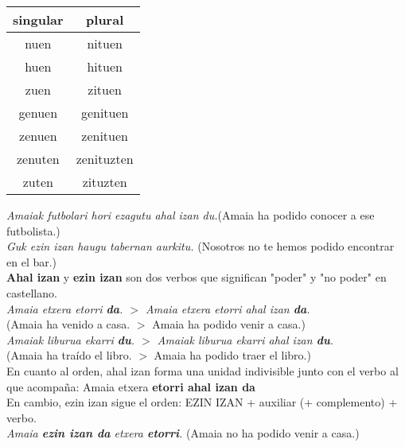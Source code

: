 \documentclass[11pt, a4paper]{article}
\begin{document}
\begin{table}[h]
\centering
\begin{tabular}{cc}
\hline
singular&plural\\
\hline
nuen&nituen\\
huen&hituen\\
zuen&zituen\\
genuen&genituen\\
zenuen&zenituen\\
zenuten&zenituzten\\
zuten&zituzten\\
\end{tabular}
\end{table}

\indent \textit{Amaiak futbolari hori ezagutu ahal izan du.}(Amaia ha podido conocer a ese futbolista.)\\
\indent \textit{Guk ezin izan haugu tabernan aurkitu.}
(Nosotros no te hemos podido encontrar en el bar.)\\

\noindent \textbf{Ahal izan} y \textbf{ezin izan} son dos verbos que significan "poder" y "no poder" en castellano.\\

\indent \textit{Amaia etxera etorri \textbf{da}. $>$ Amaia etxera etorri ahal izan \textbf{da}.}\\
\indent (Amaia ha venido a casa. $>$ Amaia ha podido venir a casa.)\\

\indent \textit{Amaiak liburua ekarri \textbf{du}. $>$ Amaiak liburua ekarri ahal izan \textbf{du}.}\\
\indent (Amaia ha traído el libro. $>$ Amaia ha podido traer el libro.)\\

\noindent En cuanto al orden, ahal izan forma una unidad indivisible junto con el verbo al que acompaña:
\indent Amaia etxera \textbf{etorri ahal izan da}\\
\noindent En cambio, ezin izan sigue el orden: EZIN IZAN + auxiliar (+ complemento) + verbo.\\
\indent \textit{Amaia \textbf{ezin izan da} etxera \textbf{etorri}.}
(Amaia no ha podido venir a casa.)
\end{document}
